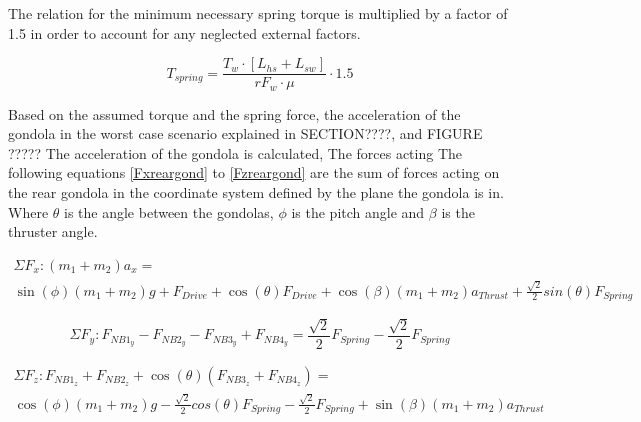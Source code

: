 \documentclass[../main.tex]{subfiles}
\begin{document}
The relation for the minimum necessary spring torque is multiplied by a factor of 1.5 in order to account for any neglected external factors.

\begin{equation}
T_{spring} = \frac{T_w\cdot{}[L_{hs}+L_{sw}]}{r{F_w}\cdot{}\mu}\cdot{}1.5
\end{equation}

Based on the assumed torque and the spring force, the acceleration of the gondola in the worst case scenario explained in SECTION????, and FIGURE ????? The acceleration of the gondola is calculated, The forces acting 
The following equations \ref{Fxreargond} to \ref{Fzreargond} are the sum of forces acting on the rear gondola in the coordinate system defined by the plane the gondola is in. 
Where $\theta$ is the angle between the gondolas, $\phi$ is the pitch angle and $\beta$ is the thruster angle.

\begin{multline} \label{Fxreargond}
\Sigma F_{x} : (m_{1}+m_{2}) a_{x} =\\ \sin(\phi) (m_{1} + m_2)g + F_{Drive} + \cos (\theta) F_{Drive} + \cos(\beta) (m_1+m_2) a_{Thrust} + \frac{\sqrt{2}}{2} sin(\theta) F_{Spring}
\end{multline}

\begin{equation} \label{Fyreargond}
\Sigma F_{y} : F_{NB1_{y}} - F_{NB2_{y}} - F_{NB3_{y}} + F_{NB4_{y}} = \frac{\sqrt{2}}{2} F_{Spring} -\frac{\sqrt{2}}{2} F_{Spring}
\end{equation}

\begin{multline} \label{Fzreargond}
\Sigma F_{z} : F_{NB1_{z}} + F_{NB2_{z}} + \cos(\theta)(F_{NB3_{z}} + F_{NB4_{z}}) =\\ \cos(\phi) (m_{1} + m_2)g - \frac{\sqrt{2}}{2} cos(\theta) F_{Spring} -\frac{\sqrt{2}}{2} F_{Spring} + \sin(\beta) (m_1+m_2) a_{Thrust}
\end{multline}
\end{document}
